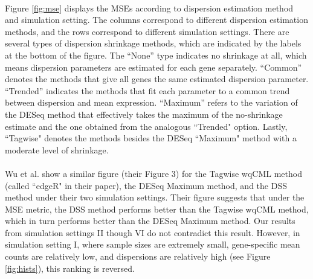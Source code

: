 \documentclass[10pt]{article}
\begin{document}
\paragraph{} \indent Figure \ref{fig:mse} displays the MSEs according to dispersion estimation method and simulation setting. The columns correspond to different dispersion estimation methods, and the rows correspond to different simulation settings. There are several types of dispersion shrinkage methods, which are indicated by the labels at the bottom of the figure. The ``None'' type indicates no shrinkage at all, which means dispersion parameters are estimated for each gene separately. ``Common'' denotes the methods that give all genes the same estimated dispersion parameter. ``Trended'' indicates the methods that fit each parameter to a common trend between dispersion and mean expression. ``Maximum'' refers to the variation of the DESeq method that effectively takes the maximum of the no-shrinkage estimate and the one obtained from the analogous ``Trended" option. Lastly, ``Tagwise" denotes the methods besides the DESeq ``Maximum" method with a moderate level of shrinkage.
 
 
 
 
 
 
\paragraph{} \indent Wu et al. \cite{dss} show a similar figure (their Figure 3) for the Tagwise wqCML method (called ``edgeR" in their paper), the DESeq Maximum method, and the DSS method under their two simulation settings. Their figure suggests that under the MSE metric, the DSS method performs better than the Tagwise wqCML method, which in turn performs better than the DESeq Maximum method. Our results from simulation settings II though VI do not contradict this result. However, in simulation setting I, where sample sizes are extremely small, gene-specific mean counts are relatively low, and dispersions are relatively high (see Figure \ref{fig:hists}), this ranking is reversed.
\end{document}
